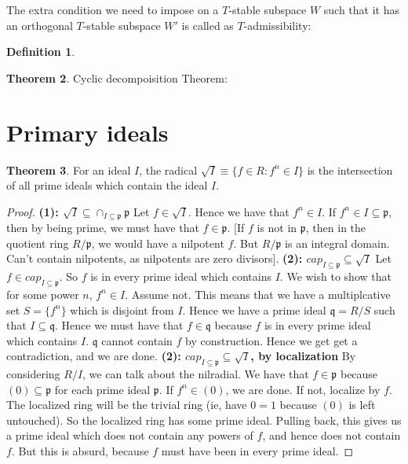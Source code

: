 \documentclass{book}
\newcommand{\p}{\mathfrak{p}}
\newcommand{\q}{\mathfrak{q}}
\newcommand{\rad}{\sqrt} %
\theoremstyle{definition}
\newtheorem{theorem}{Theorem}
\newtheorem{definition}[theorem]{Definition}
\begin{document}
The extra condition we need to impose on a $T$-stable subspace
$W$ such that it has an orthogonal $T$-stable subspace $W'$ is called as $T$-admissibility:
\begin{definition}
\end{definition}

\begin{theorem}
Cyclic decompoisition Theorem:
\end{theorem}

\section{Primary ideals}

\begin{theorem}
For an ideal $I$, the radical $\rad I \equiv \{ f \in R: f^n \in I \}$ is
the intersection of all prime ideals which contain the ideal $I$.
\end{theorem}
\begin{proof}
\textbf{(1): $\rad I \subseteq \cap_{I \subseteq \p} \p$}
Let $f \in \rad I$. Hence we have that $f^n \in I$. If $f^n \in I \subseteq \p$,
then by being prime, we must have that $f \in \p$. [If $f$ is not in $\p$,
then in the quotient ring $R/\p$, we would have a nilpotent $f$. But $R/\p$
is an integral domain. Can't contain nilpotents, as nilpotents are zero divisors].
\textbf{(2): $cap_{I \subseteq \p} \subseteq \rad I$}
Let $f \in cap_{I \subseteq \p}$. So $f$ is in every prime ideal which contains
$I$. We wish to show that for some power $n$, $f^n \in I$. Assume not. This
means that we have a multiplcative set $S = \{ f^n \}$ which is disjoint
from $I$. Hence we have a prime ideal $\q = R/S$ such that $I \subseteq \q$.
Hence we must have that $f \in \q$ because $f$ is in every prime ideal
which contains $I$. $\q$ cannot contain $f$ by construction. Hence we get
get a contradiction, and we are done.
\textbf{(2): $cap_{I \subseteq \p} \subseteq \rad I$, by localization}
By considering $R/I$, we can talk about the nilradial.
We have that $f \in \p$ because $(0) \subseteq \p$ for each prime ideal $\p$.
If $f^n \in (0)$,
we are done. If not, localize by $f$. The localized ring will be the trivial
ring (ie, have $0 = 1$ because $(0)$ is left untouched). So the localized
ring has some prime ideal. Pulling back, this gives us a prime ideal which
does not contain any powers of $f$, and hence does not contain $f$. But
this is absurd, because $f$ must have been in every prime ideal.
\end{proof}
\end{document}
